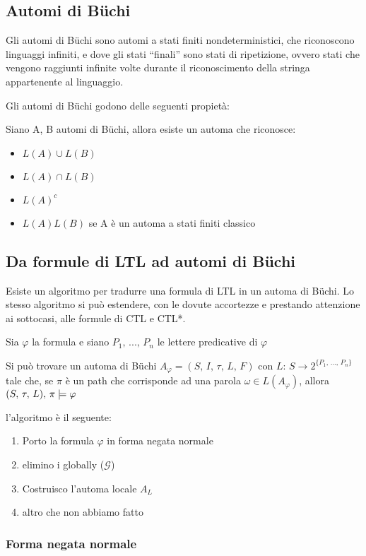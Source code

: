 \subsection{Automi di Büchi}

Gli automi di Büchi sono automi a stati finiti nondeterministici,
che riconoscono linguaggi infiniti, e dove gli stati ``finali''
sono stati di ripetizione, ovvero stati che vengono raggiunti infinite
volte durante il riconoscimento della stringa appartenente al linguaggio.

Gli automi di Büchi godono delle seguenti propietà:

Siano A, B automi di Büchi, allora esiste un automa che riconosce:
\begin{itemize}
\item $L(A)\cup L(B)$
\item $L(A)\cap L(B)$
\item $L(A)^{c}$
\item $L(A)L(B)$ se A è un automa a stati finiti classico
\end{itemize}

\subsection{Da formule di LTL ad automi di Büchi}

Esiste un algoritmo per tradurre una formula di LTL in un automa di
Büchi. Lo stesso algoritmo si può estendere, con le dovute accortezze
e prestando attenzione ai sottocasi, alle formule di CTL e CTL{*}.

Sia $\varphi$ la formula e siano $P_{1},\,...,\, P_{n}$ le lettere
predicative di $\varphi$

Si può trovare un automa di Büchi $A_{\varphi}=(S,\, I,\,\tau,\, L,\, F)$
con $L:\, S\longrightarrow2^{\{P_{1},\,...,\, P_{n}\}}$tale che,
se $\pi$ è un path che corrisponde ad una parola $\omega\in L(A_{\varphi})$,
allora $(S,\,\tau,\, L),\,\pi\models\varphi$

l'algoritmo è il seguente:
\begin{enumerate}
\item Porto la formula $\varphi$ in forma negata normale
\item elimino i globally ($\mathcal{G}$)
\item Costruisco l'automa locale $A_{L}$
\item altro che non abbiamo fatto
\end{enumerate}

\subsubsection{Forma negata normale }

